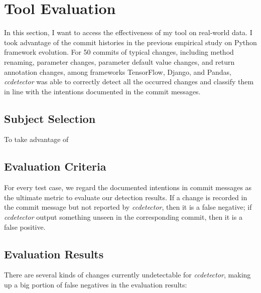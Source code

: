 \chapter{Tool Evaluation}
\label{chap:tool-evaluation}

In this section, I want to access the effectiveness of my tool on real-world data. I took advantage of the commit histories in the previous empirical study on Python framework evolution. For 50 commits of typical changes, including method renaming, parameter changes, parameter default value changes, and return annotation changes, among frameworks TensorFlow, Django, and Pandas, \textit{ccdetector} was able to correctly detect all the occurred changes and classify them in line with the intentions documented in the commit messages.

\section{Subject Selection}

To take advantage of 

\section{Evaluation Criteria}

For every test case, we regard the documented intentions in commit messages as the ultimate metric to evaluate our detection results. If a change is recorded in the commit message but not reported by \textit{ccdetector}, then it is a false negative; if \textit{ccdetector} output something unseen in the corresponding commit, then it is a false positive.

\section{Evaluation Results}

There are several kinds of changes currently undetectable for \textit{ccdetector}, making up a big portion of false negatives in the evaluation results:

